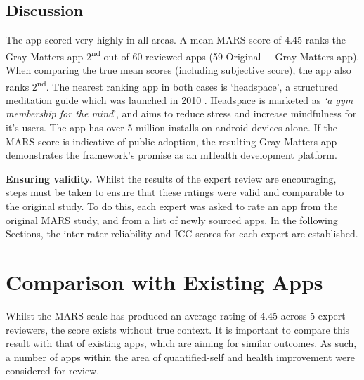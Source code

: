 \subsection{Discussion}
The app scored very highly in all areas. A mean MARS score of 4.45 ranks the Gray Matters app 2\textsuperscript{nd} out of 60 reviewed apps (59 Original + Gray Matters app). When comparing the true mean scores (including subjective score), the app also ranks 2\textsuperscript{nd}. The nearest ranking app in both cases is `headspace', a structured meditation guide which was launched in 2010 \cite{HEADSPACE}. Headspace is marketed as \textit{`a gym membership for the mind}', and aims to reduce stress and increase mindfulness for it's users. The app has over 5 million installs on android devices alone. If the MARS score is indicative of public adoption, the resulting Gray Matters app demonstrates the framework's promise as an mHealth development platform.

\textbf{Ensuring validity.}
Whilst the results of the expert review are encouraging, steps must be taken to ensure that these ratings were valid and comparable to the original study. To do this, each expert was asked to rate an app from the original MARS study, and from a list of newly sourced apps. In the following Sections, the inter-rater reliability and ICC scores for each expert are established. 

\section{Comparison with Existing Apps}
Whilst the MARS scale has produced an average rating of 4.45 across 5 expert reviewers, the score exists without true context. It is important to compare this result with that of existing apps, which are aiming for similar outcomes. As such, a number of apps within the area of quantified-self and health improvement were considered for review.
 


